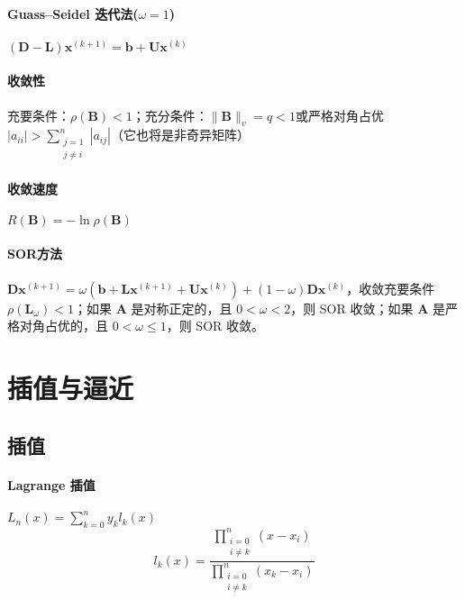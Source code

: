 \documentclass[twocolumn]{ctexart}
\begin{document}
\paragraph{Guass--Seidel 迭代法($\omega=1$)} $(\mathbf{D}-\mathbf{L})\mathbf{x}^{(k+1)}=\mathbf{b}+\mathbf{U}\mathbf{x}^{(k)}$

\paragraph{收敛性} 充要条件：$\rho(\mathbf{B})<1$；充分条件：$\lVert\mathbf{B}\rVert_v=q<1$或严格对角占优 $|a_{ii}|>\sum_{\substack{j=1\\j\neq i}}^n|a_{ij}|$（它也将是非奇异矩阵）

\paragraph{收敛速度} $R(\mathbf{B})=-\ln\rho(\mathbf{B})$

\paragraph{SOR方法} $\mathbf{D}\mathbf{x}^{(k+1)}=\omega(\mathbf{b}+\mathbf{L}\mathbf{x}^{(k+1)}+\mathbf{U}\mathbf{x}^{(k)})+(1-\omega)\mathbf{D}\mathbf{x}^{(k)}$，收敛充要条件 $\rho(\mathbf{L}_\omega)<1$；如果 $\mathbf{A}$ 是对称正定的，且 $0<\omega<2$，则 SOR 收敛；如果 $\mathbf{A}$ 是严格对角占优的，且 $0<\omega\leq 1$，则 SOR 收敛。


\section{插值与逼近}

\subsection{插值}

\paragraph{Lagrange 插值} $L_n(x)=\sum_{k=0}^ny_kl_k(x)$
\begin{equation*}
    l_k(x)=\frac{\prod_{\substack{i=0\\ i\neq k}}^n (x-x_i)}{\prod_{\substack{i=0\\ i\neq k}}^n(x_k-x_i)}
\end{equation*}
\end{document}
